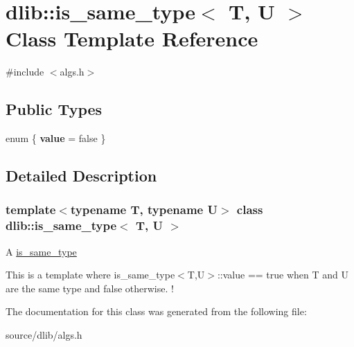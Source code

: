 \hypertarget{classdlib_1_1is__same__type}{
\section{dlib::is\_\-same\_\-type$<$ T, U $>$ Class Template Reference}
\label{classdlib_1_1is__same__type}
}


{\ttfamily \#include $<$algs.h$>$}\subsection*{Public Types}
\begin{DoxyCompactItemize}
\item 
enum \{ {\bfseries value} =  false
 \}
\end{DoxyCompactItemize}


\subsection{Detailed Description}
\subsubsection*{template$<$typename T, typename U$>$ class dlib::is\_\-same\_\-type$<$ T, U $>$}

A \hyperlink{classdlib_1_1is__same__type}{is\_\-same\_\-type}

This is a template where is\_\-same\_\-type$<$T,U$>$::value == true when T and U are the same type and false otherwise. ! 

The documentation for this class was generated from the following file:\begin{DoxyCompactItemize}
\item 
source/dlib/algs.h\end{DoxyCompactItemize}
